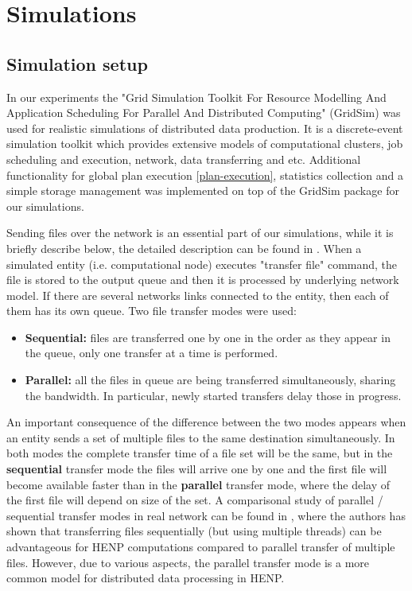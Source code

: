 \documentclass{svjour3}                     %
\begin{document}
\section{Simulations}
\subsection{Simulation setup}
In our experiments the "Grid Simulation Toolkit For Resource Modelling And Application Scheduling For Parallel And Distributed Computing" (GridSim) \cite{GridSim} was used for realistic simulations of distributed data production. It is a discrete-event simulation toolkit which provides extensive models of computational clusters, job scheduling and execution, network, data transferring and etc. Additional functionality for global plan execution \ref{plan-execution}, statistics collection and a simple storage management was implemented on top of the GridSim package for our simulations.

Sending files over the network is an essential part of our simulations, while it is briefly describe below, the detailed description can be found in \cite{GridSimNetwork}. When a simulated entity (i.e. computational node) executes "transfer file" command, the file is stored to the output queue and then it is processed by underlying network model. If there are several networks links connected to the entity, then each of them has its own queue. Two file transfer modes were used:
\begin{itemize}
\item \textbf{Sequential:} files are transferred one by one in the order as they appear in the queue, only one transfer at a time is performed. 
\item \textbf{Parallel:} all the files in queue are being transferred simultaneously, sharing the bandwidth.  In particular, newly started transfers delay those in progress.
\end{itemize}
An important consequence of the difference between the two modes appears when an entity sends a set of multiple files to the same destination simultaneously. In both modes the complete transfer time of a file set will be the same, but in the \textbf{sequential} transfer mode the files will arrive one by one and the first file will become available faster than in the \textbf{parallel} transfer mode, where the delay of the first file will depend on size of the set. A comparisonal study of parallel / sequential transfer modes in real network can be found in \cite{Zerola}, where the authors has shown that transferring files sequentially (but using multiple threads) can be advantageous for HENP computations compared to parallel transfer of multiple files. However, due to various aspects, the parallel transfer mode is a more common model for distributed data processing in HENP.
\end{document}
